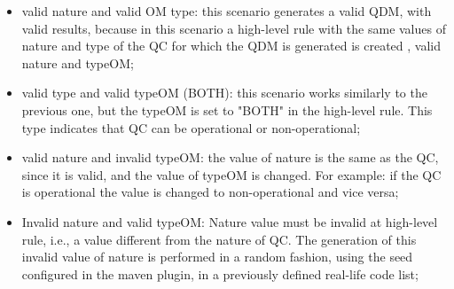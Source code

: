 \begin{itemize}


\item valid nature and valid OM type: this scenario generates a valid QDM, with valid results, because in this scenario a high-level rule with the same values of nature and type of the QC for which the QDM is generated is created , valid nature and typeOM;


\item valid type and valid typeOM (BOTH): this scenario works similarly to the previous one, but the typeOM is set to "BOTH" in the high-level rule. This type indicates that QC can be operational or non-operational;


\item valid nature and invalid typeOM: the value of nature is the same as the QC, since it is valid, and the value of typeOM is changed. For example: if the QC is operational the value is changed to non-operational and vice versa;


\item Invalid nature and valid typeOM: Nature value must be invalid at high-level rule, i.e., a value different from the nature of QC. The generation of this invalid value of nature is performed in a random fashion, using the seed configured in the maven plugin, in a previously defined real-life code list;


\end{itemize}
